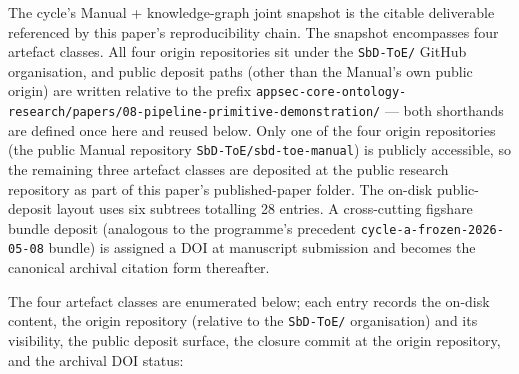 \documentclass[
]{article}
\begin{document}
The cycle's Manual + knowledge-graph joint snapshot is the citable
deliverable referenced by this paper's reproducibility chain. The
snapshot encompasses four artefact classes. All four origin repositories
sit under the \texttt{SbD-ToE/} GitHub organisation, and public deposit
paths (other than the Manual's own public origin) are written relative
to the prefix
\texttt{appsec-core-ontology-research/papers/08-pipeline-primitive-demonstration/}
--- both shorthands are defined once here and reused below. Only one of
the four origin repositories (the public Manual repository
\texttt{SbD-ToE/sbd-toe-manual}) is publicly accessible, so the
remaining three artefact classes are deposited at the public research
repository as part of this paper's published-paper folder. The on-disk
public-deposit layout uses six subtrees totalling 28 entries. A
cross-cutting figshare bundle deposit (analogous to the programme's
precedent \texttt{cycle-a-frozen-2026-05-08} bundle) is assigned a DOI
at manuscript submission and becomes the canonical archival citation
form thereafter.

The four artefact classes are enumerated below; each entry records the
on-disk content, the origin repository (relative to the
\texttt{SbD-ToE/} organisation) and its visibility, the public deposit
surface, the closure commit at the origin repository, and the archival
DOI status:
\end{document}

